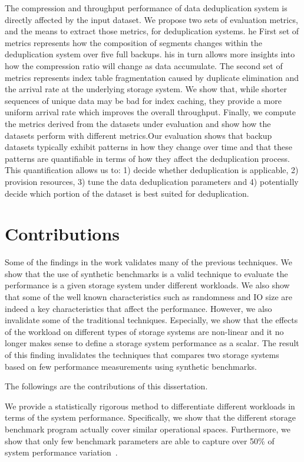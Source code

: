 The compression and throughput performance of data deduplication system is directly affected by the input dataset. 
We propose two sets of evaluation metrics, and the means to extract those metrics, for deduplication systems. 
he First set of metrics represents how the composition of segments changes within the deduplication system over five full backups. 
his in turn allows more insights into how the compression ratio will change as data accumulate.
The second set of metrics represents index table fragmentation caused by duplicate elimination and the arrival rate at the underlying storage system.
We show that, while shorter sequences of unique data may be bad for index caching, they provide a more uniform arrival rate which improves the overall throughput.
Finally, we compute the metrics derived from the datasets  under evaluation and show how the datasets perform with different metrics.Our evaluation shows that backup datasets typically exhibit patterns in how they change over time and that these patterns are quantifiable in terms of how they affect the deduplication process.
This quantification allows us to: 1) decide whether deduplication is applicable, 2) provision resources, 3) tune the data deduplication parameters and 4) potentially decide which portion of the dataset is best suited for deduplication.

\section{Contributions}
Some of the findings in the work validates many of the previous techniques.
We show that the use of synthetic benchmarks is a valid technique to evaluate the performance is a given storage system under different workloads. 
We also show that some of the well known characteristics such as randomness and IO size are indeed a key characteristics that affect the performance. 
However, we also invalidate some of the traditional techniques. 
Especially, we show that the effects of the workload on different types of storage systems are non-linear and it no longer makes sense to define a storage system performance as a scalar. 
The result of this finding invalidates the techniques that compares two storage systems based on few performance measurements using synthetic benchmarks.
 
The followings are the contributions of this dissertation.

We provide a statistically rigorous method to differentiate different workloads in terms of the system performance. 
Specifically, we show that the different storage benchmark program actually cover similar operational spaces. 
Furthermore, we show that only few benchmark parameters are able to capture over 50\% of system performance variation~\cite{park:2011}. 

